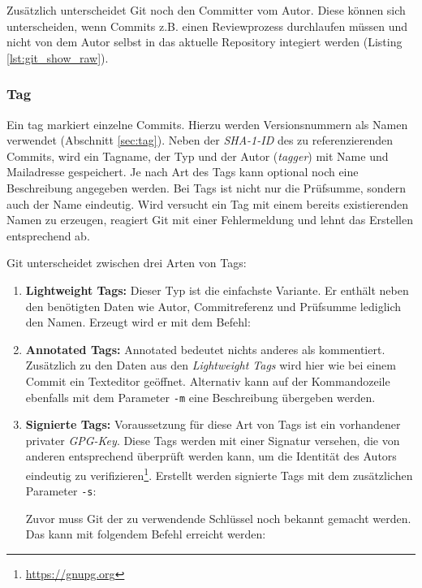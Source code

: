 
Zusätzlich unterscheidet Git noch den Committer vom Autor. Diese können sich
unterscheiden, wenn Commits z.B. einen Reviewprozess durchlaufen müssen und
nicht von dem Autor selbst in das aktuelle Repository integiert werden (Listing
\ref{lst:git_show_raw}).

\subsubsection{Tag}\label{sec:tagobject}
Ein \gls{tag} markiert einzelne Commits. Hierzu werden Versionsnummern als
Namen verwendet (Abschnitt \ref{sec:tag}). Neben der \textit{SHA-1-ID} des zu
referenzierenden Commits, wird ein Tagname, der Typ und der Autor
(\textit{tagger}) mit Name und Mailadresse gespeichert. Je nach Art des Tags
kann optional noch eine Beschreibung angegeben werden. Bei Tags ist nicht nur
die Prüfsumme, sondern auch der Name eindeutig. Wird versucht ein Tag mit einem
bereits existierenden Namen zu erzeugen, reagiert Git mit einer
Fehlermeldung und lehnt das Erstellen entsprechend ab.

Git unterscheidet zwischen drei Arten von Tags:

\begin{enumerate}
\item \textbf{Lightweight Tags:} Dieser Typ ist die einfachste Variante. Er
enthält neben den benötigten Daten wie Autor, Commitreferenz und Prüfsumme
lediglich den Namen. Erzeugt wird er mit dem Befehl:


\item \textbf{Annotated Tags:} Annotated bedeutet nichts anderes als
kommentiert. Zusätzlich zu den Daten aus den \textit{Lightweight Tags} wird
hier wie bei einem Commit ein Texteditor geöffnet. Alternativ kann auf der
Kommandozeile ebenfalls mit dem Parameter \texttt{-m} eine Beschreibung
übergeben werden.


\item \textbf{Signierte Tags:} Voraussetzung für diese Art von Tags ist ein
vorhandener privater \textit{GPG-Key}. Diese Tags werden mit einer Signatur
versehen, die von anderen entsprechend überprüft werden kann, um die Identität
des Autors eindeutig zu verifizieren\footnote{\url{https://gnupg.org}}.
Erstellt werden signierte Tags mit dem zusätzlichen Parameter \texttt{-s}:


Zuvor muss Git der zu verwendende Schlüssel noch bekannt gemacht werden. Das
kann mit folgendem Befehl erreicht werden:

\end{enumerate}

